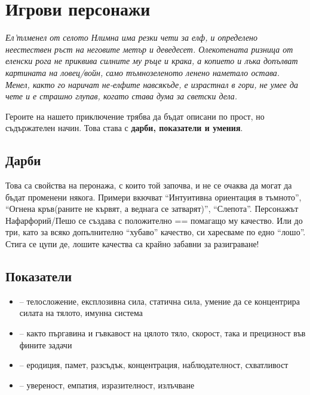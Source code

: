 \section{Игрови персонажи}
\emph{Ел'тлменел от селото Нлимна има резки чети за елф, и определено неестествен ръст на неговите метър и деведесет.
Олекотената ризница от еленски рога не приквива силните му ръце и крака, а копието и лъка допълват картината на ловец/войн, само тъмнозеленото ленено наметало остава.
Менел, както го наричат не-елфите навсякъде, е израстнал в гори, не умее да чете и е страшно глупав, когато става дума за светски дела.}

Героите на нашето приключение трябва да бъдат описани по прост, но съдържателен начин.
Това става с \textbf{дарби, показатели и умения}.

\subsection{Дарби}
Това са свойства на перонажа, с които той започва, и не се очаква да могат да бъдат променени някога.
Примери вкючват “Интуитивна ориентация в тъмното”, “Огнена кръв(раните не кървят, а веднага се затварят)”, “Слепота”.
Персонажът Нафарфорий/Пешо се създава с { положително} == помагащо му качество.
Или до { три}, като за всяко допълнително “хубаво” качество, си харесваме по едно “лошо”. Стига се цупи де, лошите качества са крайно забавни за разиграване!

\subsection{Показатели}
\begin{itemize}
\item {} – телосложение, експлозивна сила, статична сила, умение да се концентрира силата на тялото, имунна система
\item {} – както пъргавина и гъвкавост на цялото тяло, скорост, така и прецизност във фините задачи
\item {} – еродиция, памет, разсъдък, концентрация, наблюдателност, схватливост
\item {} – увереност, емпатия, изразителност, излъчване
\end{itemize}

